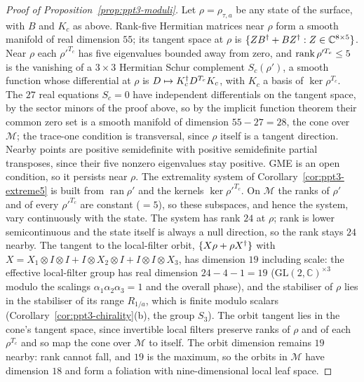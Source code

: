 \begin{proof}[Proof of Proposition~\ref{prop:ppt3-moduli}]
Let $\rho=\rho_{\tau,a}$ be any state of the surface, with $B$ and $K_c$ as above. Rank-five Hermitian matrices near $\rho$ form a smooth manifold of real
dimension $55$; its tangent space at $\rho$ is $\{ZB^{\dagger}+BZ^{\dagger}:Z\in\mathbb C^{8\times5}\}$. Near $\rho$ each $\rho'^{T_c}$ has five eigenvalues bounded away from
zero, and $\operatorname{rank}\rho'^{T_c}\le5$ is the vanishing of a $3\times3$ Hermitian Schur complement $S_c(\rho')$, a smooth
function whose differential at $\rho$ is $D\mapsto K_c^{\dagger} D^{T_c}K_c$, with $K_c$ a basis of $\ker\rho^{T_c}$. The
$27$ real equations $S_c=0$ have independent differentials on the tangent space, by the sector minors of the proof above, so by
the implicit function theorem their common zero set is a smooth manifold of dimension $55-27=28$, the cone over
$\mathcal M$; the trace-one condition is transversal, since $\rho$ itself is a tangent direction. Nearby points
are positive semidefinite with positive semidefinite partial transposes, since their five nonzero eigenvalues stay
positive. GME is an open condition, so it persists near $\rho$. The extremality system of
Corollary~\ref{cor:ppt3-extreme5} is built from $\operatorname{ran}\rho'$ and the kernels $\ker\rho'^{T_c}$. On $\mathcal M$ the ranks
of $\rho'$ and of every $\rho'^{T_c}$ are constant ($=5$), so these subspaces, and hence the system, vary continuously with the state.
The system has rank $24$ at $\rho$; rank is lower semicontinuous and the state itself is always a null direction, so the rank
stays $24$ nearby. The tangent to the
local-filter orbit, $\{X\rho+\rho X^{\dagger}\}$ with $X=X_1\otimes I\otimes I+I\otimes X_2\otimes I+I\otimes I\otimes X_3$,
has dimension $19$ including scale: the effective local-filter group has real dimension $24-4-1=19$
($\mathrm{GL}(2,\mathbb C)^{\times3}$ modulo the scalings $\alpha_1\alpha_2\alpha_3=1$ and the overall phase), and the
stabiliser of $\rho$ lies in the stabiliser of its range $R_{1/a}$, which is finite modulo scalars
(Corollary~\ref{cor:ppt3-chirality}(b), the group $S_3$).
The orbit tangent lies in the
cone's tangent space, since invertible local filters preserve ranks of $\rho$ and of each $\rho^{T_c}$ and so map the cone
over $\mathcal M$ to itself. The orbit dimension remains $19$
nearby: rank cannot fall, and $19$ is the maximum, so the orbits in
$\mathcal M$ have dimension $18$ and form a foliation with nine-dimensional local leaf space.
\end{proof}
